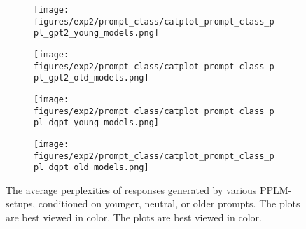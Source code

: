 \begin{figure}[H]
     \centering
     \begin{subfigure}[b]{0.48\textwidth}
        \centering
        \texttt{[image: figures/exp2/prompt\_class/catplot\_prompt\_class\_ppl\_gpt2\_young\_models.png]}
        \caption{}
        \label{subfig:catplot_prompt_class_ppl_gpt2_young}
     \end{subfigure}
     \quad
     \begin{subfigure}[b]{0.48\textwidth}
        \centering
        \texttt{[image: figures/exp2/prompt\_class/catplot\_prompt\_class\_ppl\_gpt2\_old\_models.png]}
        \caption{}
        \label{subfig:catplot_prompt_class_ppl_gpt2_old}
     \end{subfigure}
    \medskip
    \begin{subfigure}[b]{0.48\textwidth}
        \centering
        \texttt{[image: figures/exp2/prompt\_class/catplot\_prompt\_class\_ppl\_dgpt\_young\_models.png]}
        \caption{}
        \label{subfig:catplot_prompt_class_ppl_dgpt_young}
     \end{subfigure}
    \quad
     \begin{subfigure}[b]{0.48\textwidth}
        \centering
        \texttt{[image: figures/exp2/prompt\_class/catplot\_prompt\_class\_ppl\_dgpt\_old\_models.png]}
        \caption{}
        \label{subfig:catplot_prompt_class_ppl_dgpt_old}
     \end{subfigure}
    \caption{The average perplexities of responses generated by various PPLM-setups, conditioned on younger, neutral, or older prompts. The plots are best viewed in color. The plots are best viewed in color.}
    \label{fig:catplot_prompt_class_ppl}
\end{figure}




